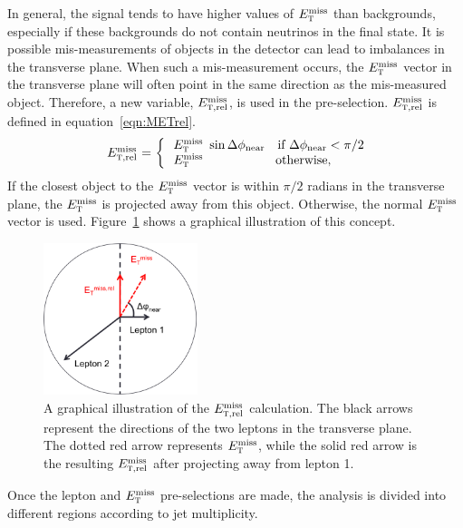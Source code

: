 In general, the signal tends to have higher values of $E_{\textrm{\footnotesize\sc t}}^{\rm miss}$ than backgrounds, especially if these backgrounds do not contain neutrinos in the final state. It is possible mis-measurements of objects in the detector can lead to imbalances in the transverse plane. When such a mis-measurement occurs, the $E_{\textrm{\footnotesize\sc t}}^{\rm miss}$ vector in the transverse plane will often point in the same direction as the mis-measured object. Therefore, a new variable, $E_{{\textrm{\footnotesize\sc t}},{\rm rel}}^{\rm miss}$, is used in the pre-selection. $E_{{\textrm{\footnotesize\sc t}},{\rm rel}}^{\rm miss}$ is defined in equation~\ref{eqn:METrel}. 
%
\begin{equation}
  \begin{array}{ll}
  \multirow{2}{*}{$\METrel$ =\ \bigg\{ }
    &\!\!\!\!\MET\ \sin\dphiNear\quad\textrm{if $\dphiNear<\pi/2$}\\
    &\!\!\!\!\MET\ \phantom{\sin\dphiNear}\quad\textrm{otherwise,}
  \end{array}
\label{eqn:METrel}
\end{equation}
%
If the closest object to the $E_{\textrm{\footnotesize\sc t}}^{\rm miss}$ vector is within $\pi/2$ radians in the transverse plane, the $E_{\textrm{\footnotesize\sc t}}^{\rm miss}$ is projected away from this object. Otherwise, the normal $E_{\textrm{\footnotesize\sc t}}^{\rm miss}$ vector is used. Figure~\ref{fig:METrel} shows a graphical illustration of this concept. 
%
\begin{figure}[h!]
  \centering
  \captionsetup{justification=centering}

  \includegraphics[width=0.4\textwidth]{figures/METrel_cartoon}
  \caption{A graphical illustration of the $E_{{\textrm{\footnotesize\sc t}},{\rm rel}}^{\rm miss}$ calculation. The black arrows represent the directions of the two leptons in the transverse plane. The dotted red arrow represents $E_{\textrm{\footnotesize\sc t}}^{\rm miss}$, while the solid red arrow is the resulting $E_{{\textrm{\footnotesize\sc t}},{\rm rel}}^{\rm miss}$ after projecting away from lepton 1.}
  \label{fig:METrel}
\end{figure}

Once the lepton and $E_{\textrm{\footnotesize\sc t}}^{\rm miss}$ pre-selections are made, the analysis is divided into different regions according to jet multiplicity.

